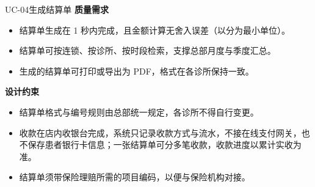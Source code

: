 \documentclass[11pt,a4paper]{ctexart}
\begin{document}
\begin{ucbox}{UC-04\quad 生成结算单}
\vspace{2pt}
\textbf{质量需求}
\begin{itemize}[leftmargin=1.4em,topsep=2pt,itemsep=1pt]
  \item 结算单生成在 1 秒内完成，且金额计算无舍入误差（以分为最小单位）。
  \item 结算单可按连锁、按诊所、按时段检索，支撑总部月度与季度汇总。
  \item 生成的结算单可打印或导出为 PDF，格式在各诊所保持一致。
\end{itemize}

\vspace{2pt}
\textbf{设计约束}
\begin{itemize}[leftmargin=1.4em,topsep=2pt,itemsep=1pt]
  \item 结算单格式与编号规则由总部统一规定，各诊所不得自行变更。
  \item 收款在店内收银台完成，系统只记录收款方式与流水，不接在线支付网关，也不保存患者银行卡信息；一张结算单可分多笔收款，收款进度以累计实收为准。
  \item 结算单须带保险理赔所需的项目编码，以便与保险机构对接。
\end{itemize}
\end{ucbox}
\end{document}
